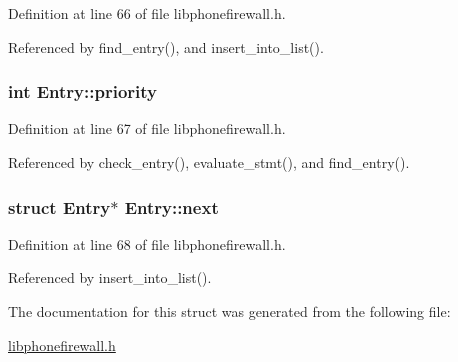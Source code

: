 Definition at line 66 of file libphonefirewall.h.

Referenced by find\_\-entry(), and insert\_\-into\_\-list().\hypertarget{structEntry_85af261b3171c257892b54a7200da061}{
\subsubsection{\setlength{\rightskip}{0pt plus 5cm}int {\bf Entry::priority}}}
\label{structEntry_85af261b3171c257892b54a7200da061}




Definition at line 67 of file libphonefirewall.h.

Referenced by check\_\-entry(), evaluate\_\-stmt(), and find\_\-entry().\hypertarget{structEntry_08cba741f383cd7da0f3ab9aee6e3cd5}{
\subsubsection{\setlength{\rightskip}{0pt plus 5cm}struct {\bf Entry}$\ast$ {\bf Entry::next}}}
\label{structEntry_08cba741f383cd7da0f3ab9aee6e3cd5}




Definition at line 68 of file libphonefirewall.h.

Referenced by insert\_\-into\_\-list().

The documentation for this struct was generated from the following file:\begin{CompactItemize}
\item 
\hyperlink{libphonefirewall_8h}{libphonefirewall.h}\end{CompactItemize}
